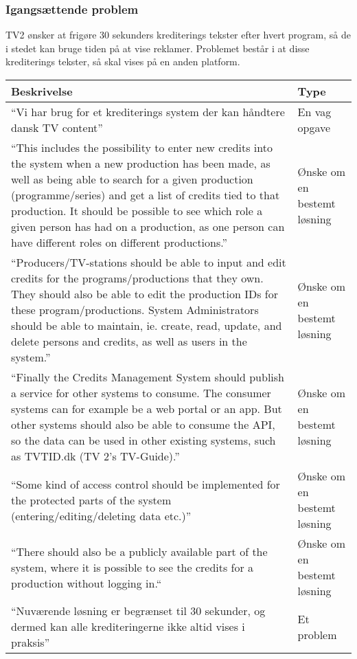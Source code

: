 \subsubsection{Igangsættende problem}
TV2 ønsker at frigøre 30 sekunders krediterings tekster efter hvert program, så de i stedet kan bruge tiden på at vise reklamer. Problemet består i at disse krediterings tekster, så skal vises på en anden platform. \\

\begin{center}
\begin{tabular}{|p{10cm}|p{4cm}|}
\hline
\textbf{Beskrivelse} & \textbf{Type} \\
\hline
“Vi har brug for  et krediterings system der kan  håndtere  dansk TV content” 
& En vag opgave \\

\hline
“This includes the possibility to enter new credits into the system when a new production has been made, as well as being able to search for a given production (programme/series) and get a list of credits tied to that production. It should be possible to see which role a given person has had on a production, as one person can have different roles on different productions.” 
& Ønske om en bestemt løsning \\

\hline 
“Producers/TV-stations should be able to input and edit credits for the programs/productions that they own. They should also be able to edit the production IDs for these program/productions. System Administrators should be able to maintain, ie. create, read, update, and delete persons and credits, as well as users in the system.” 
& Ønske om en bestemt løsning \\

\hline
“Finally the Credits Management System should publish a service for other systems to consume. The consumer systems can for example be a web portal or an app. But other systems should also be able to consume the API, so the data can be used in other existing systems, such as TVTID.dk (TV 2’s TV-Guide).”
& Ønske om en bestemt løsning \\

\hline
“Some kind of access control should be implemented for the protected parts of the system (entering/editing/deleting data etc.)” 
& Ønske om en bestemt løsning \\

\hline
“There should also be a publicly available part of the system, where it is possible to see the credits for a production without logging in.“ 
& Ønske om en bestemt løsning \\

\hline
“Nuværende løsning er begrænset til 30 sekunder, og dermed kan alle krediteringerne ikke altid vises i praksis” 
& Et problem \\

\hline
\end{tabular}
\end{center}

